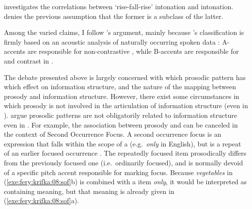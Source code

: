 

\noindent \citeauthor{constant:12} investigates the correlations
between `rise-fall-rise' intonation and  intonation.
\citeauthor{constant:12} denies the previous assumption that the
former is a subclass of the latter.



Among the varied claims, I follow \citeauthor{hedberg:06}'s argument,
mainly because \citeauthor{hedberg:06}'s classification is firmly
based on an acoustic analysis of naturally occurring spoken data
\citep{hedberg:sosa:07}: A-accents are responsible for non-contrastive
, while B-accents are responsible for  and contrast in
. 




The debate presented above is largely concerned with which prosodic
pattern has which effect on information structure, and the nature of
the mapping between prosody and information structure. However, there
exist some circumstances in which prosody is not involved in the
articulation of information structure (even in ).
\citet{fery:krifka:08} argue prosodic patterns are not obligatorily
related to information structure even in .
For example, the association between prosody and  can be canceled
in the context of Second Occurrence Focus.  A second occurrence focus
is an expression that falls within the scope of a  (e.g.\ \textit{only} in English), but is a repeat of an
earlier focused occurrence \citep{partee:99,beaver:etal:07,
  fery:ishihara:09}. The repeatedly focused item prosodically differs
from the previously focused one (i.e.\ ordinarily focused), and is
normally devoid of a specific pitch accent responsible for marking
focus.  Because \textit{vegetables} in (\ref{exe:fery:krifka:08:sof}b)
is combined with a  item \textit{only}, it would
be interpreted as containing  meaning, but that meaning is
already given in (\ref{exe:fery:krifka:08:sof}a).




